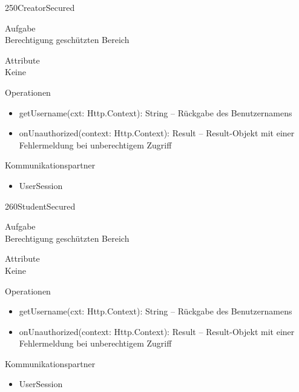 \newpage
\begin{class}{250}{CreatorSecured}
\item[Aufgabe]~\\
Berechtigung geschützten Bereich
\item[Attribute]~\\
Keine
\item[Operationen]~\\
\begin{itemize}
\item getUsername(cxt: Http.Context): String -- Rückgabe des Benutzernamens
\item onUnauthorized(context: Http.Context): Result -- Result-Objekt mit einer Fehlermeldung bei unberechtigem Zugriff
\end{itemize}
\item[Kommunikationspartner]~\\
\begin{itemize}
\item UserSession
\end{itemize}
\end{class}

\newpage
\begin{class}{260}{StudentSecured}
\item[Aufgabe]~\\
Berechtigung geschützten Bereich
\item[Attribute]~\\
Keine
\item[Operationen]~\\
\begin{itemize}
\item getUsername(cxt: Http.Context): String -- Rückgabe des Benutzernamens
\item onUnauthorized(context: Http.Context): Result -- Result-Objekt mit einer Fehlermeldung bei unberechtigem Zugriff
\end{itemize}
\item[Kommunikationspartner]~\\
\begin{itemize}
\item UserSession
\end{itemize}
\end{class}

